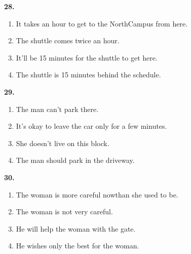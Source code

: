 \documentclass[12pt]{article}
\begin{document}
\par
\vspace{0.25\baselineskip}
\noindent\textbf{28.}
\begin{enumerate}[label=(\Alph*),leftmargin=*,itemsep=0.2em]
\item It takes an hour to get to the NorthCampus from here.
\item The shuttle comes twice an hour.
\item It'll be 15 minutes for the shuttle to get here.
\item The shuttle is 15 minutes behind the schedule.
\end{enumerate}
\par
\vspace{0.25\baselineskip}
\noindent\textbf{29.}
\begin{enumerate}[label=(\Alph*),leftmargin=*,itemsep=0.2em]
\item The man can't park there.
\item It's okay to leave the car only for a few minutes.
\item She doesn't live on this block.
\item The man should park in the driveway.
\end{enumerate}
\par
\vspace{0.25\baselineskip}
\noindent\textbf{30.}
\begin{enumerate}[label=(\Alph*),leftmargin=*,itemsep=0.2em]
\item The woman is more careful nowthan she used to be.
\item The woman is not very careful.
\item He will help the woman with the gate.
\item He wishes only the best for the woman.
\end{enumerate}
\par
\vspace{0.25\baselineskip}
\end{document}
